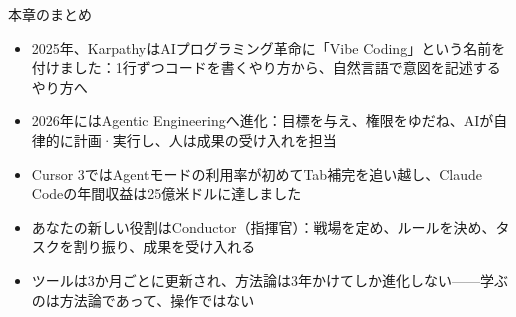 \begin{tcbsummary}{本章のまとめ}
\begin{itemize}
  \item 2025年、KarpathyはAIプログラミング革命に「Vibe Coding」という名前を付けました：1行ずつコードを書くやり方から、自然言語で意図を記述するやり方へ
  \item 2026年にはAgentic Engineeringへ進化：目標を与え、権限をゆだね、AIが自律的に計画·実行し、人は成果の受け入れを担当
  \item Cursor 3ではAgentモードの利用率が初めてTab補完を追い越し、Claude Codeの年間収益は25億米ドルに達しました
  \item あなたの新しい役割はConductor（指揮官）：戦場を定め、ルールを決め、タスクを割り振り、成果を受け入れる
  \item ツールは3か月ごとに更新され、方法論は3年かけてしか進化しない——学ぶのは方法論であって、操作ではない
\end{itemize}

\end{tcbsummary}
